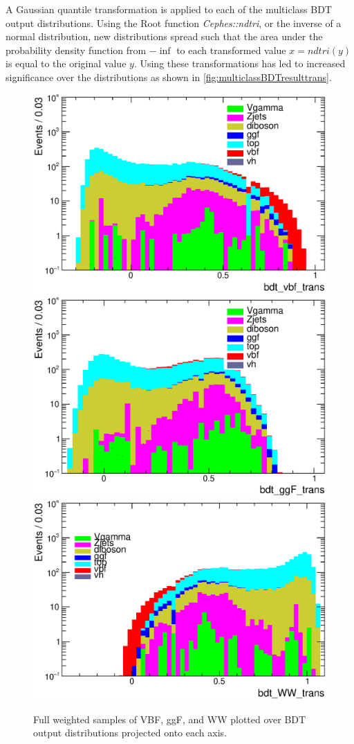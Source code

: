 A Gaussian quantile transformation is applied to each of the multiclass BDT output distributions. Using the Root function \textit{Cephes::ndtri}, or the inverse of a normal distribution, new distributions spread such that the area under the probability density function from $-\inf$ to each transformed value $x = ndtri(y)$ is equal to the original value $y$. Using these transformations has led to increased significance over the distributions as shown in \ref{fig:multiclassBDTresulttrans}.

\begin{figure}[!htbp]
\centering
  \centering
  \includegraphics[width=.3\linewidth]{Pictures/finalBDT_def/weightedmulticlassvbftrans.eps} \quad
  \includegraphics[width=.3\linewidth]{Pictures/finalBDT_def/weightedmulticlassggftrans.eps} \quad
  \includegraphics[width=.3\linewidth]{Pictures/finalBDT_def/weightedmulticlassdibosontrans.eps}
\caption{Full weighted samples of VBF, ggF, and WW plotted over BDT output distributions projected onto each axis.}
\label{fig:multiclassBDTresult}
\end{figure}

